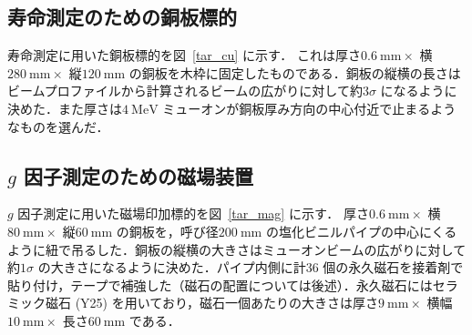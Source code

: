  



%

\newpage

\subsection{寿命測定のための銅板標的}

寿命測定に用いた銅板標的を図~\ref{tar_cu} に示す．
これは厚さ$0.6~\mathrm{mm} \times$ 横$280~\mathrm{mm} \times$ 縦$120~\mathrm{mm}$ の銅板を木枠に固定したものである．銅板の縦横の長さはビームプロファイルから計算されるビームの広がりに対して約$3\sigma$ になるように決めた．また厚さは$4~\mathrm{MeV}$ ミューオンが銅板厚み方向の中心付近で止まるようなものを選んだ．

\subsection{$g$ 因子測定のための磁場装置}

$g$ 因子測定に用いた磁場印加標的を図~\ref{tar_mag} に示す．
厚さ$0.6~\mathrm{mm} \times$ 横$80~\mathrm{mm} \times$ 縦$60~\mathrm{mm}$ の銅板を，呼び径$200~\mathrm{mm}$ の塩化ビニルパイプの中心にくるように紐で吊るした．銅板の縦横の大きさはミューオンビームの広がりに対して約$1\sigma$ の大きさになるように決めた．パイプ内側に計36 個の永久磁石を接着剤で貼り付け，テープで補強した（磁石の配置については後述）．永久磁石にはセラミック磁石 (Y25) を用いており，磁石一個あたりの大きさは厚さ$9~\mathrm{mm} \times$ 横幅$10~\mathrm{mm} \times$ 長さ$60~\mathrm{mm}$ である．

